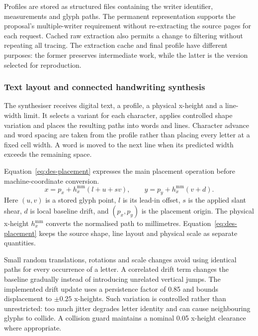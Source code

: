Profiles are stored as structured files containing the writer identifier, measurements and glyph paths. The permanent representation supports the proposal's multiple-writer requirement without re-extracting the source pages for each request. Cached raw extraction also permits a change to filtering without repeating all tracing. The extraction cache and final profile have different purposes: the former preserves intermediate work, while the latter is the version selected for reproduction.

\subsubsection{Text layout and connected handwriting synthesis}
\label{sec:des-layout}
The synthesiser receives digital text, a profile, a physical x-height and a line-width limit. It selects a variant for each character, applies controlled shape variation and places the resulting paths into words and lines. Character advance and word spacing are taken from the profile rather than placing every letter at a fixed cell width. A word is moved to the next line when its predicted width exceeds the remaining space.

Equation~\ref{eq:des-placement} expresses the main placement operation before machine-coordinate conversion.
\begin{equation}
x=p_x+h_x^{\mathrm{mm}}(l+u+sv),\qquad
y=p_y+h_x^{\mathrm{mm}}(v+d).
\label{eq:des-placement}
\end{equation}
Here $(u,v)$ is a stored glyph point, $l$ is its lead-in offset, $s$ is the applied slant shear, $d$ is local baseline drift, and $(p_x,p_y)$ is the placement origin. The physical x-height $h_x^{\mathrm{mm}}$ converts the normalised path to millimetres. Equation~\ref{eq:des-placement} keeps the source shape, line layout and physical scale as separate quantities.

Small random translations, rotations and scale changes avoid using identical paths for every occurrence of a letter. A correlated drift term changes the baseline gradually instead of introducing unrelated vertical jumps. The implemented drift update uses a persistence factor of 0.85 and bounds displacement to $\pm0.25$ x-heights. Such variation is controlled rather than unrestricted: too much jitter degrades letter identity and can cause neighbouring glyphs to collide. A collision guard maintains a nominal 0.05 x-height clearance where appropriate.

